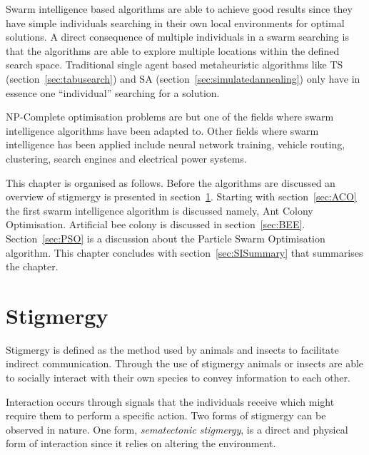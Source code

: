 Swarm intelligence based algorithms are able to achieve good results since they have simple individuals searching in their own local environments for optimal solutions\cite{CompuIntelligenceIntro,FundamentalSwarm}. A direct consequence of multiple individuals in a swarm searching is that the algorithms are able to explore multiple locations within the defined search space\cite{CompuIntelligenceIntro,FundamentalSwarm}. Traditional single agent based metaheuristic algorithms like \gls{TS} (section~\ref{sec:tabusearch}) and \gls{SA} (section~\ref{sec:simulatedannealing}) only have in essence one ``individual'' searching for a solution\cite{CompuIntelligenceIntro,FundamentalSwarm}. 

NP-Complete optimisation problems are but one of the fields where swarm intelligence algorithms have been adapted to. Other fields where swarm intelligence has been applied include neural network training\cite{CompuIntelligenceIntro}, vehicle routing\cite{ACOSurvey}, clustering\cite{AntSwarmClustering}, search engines and electrical power systems\cite{SAElectricPower}.

This chapter is organised as follows. Before the algorithms are discussed an overview of stigmergy is presented in section~\ref{sec:stigmergy}. Starting with section~\ref{sec:ACO} the first swarm intelligence algorithm is discussed namely, Ant Colony Optimisation. Artificial bee colony is discussed in section~\ref{sec:BEE}. Section~\ref{sec:PSO} is a discussion about the Particle Swarm Optimisation algorithm. This chapter concludes with section~\ref{sec:SISummary} that summarises the chapter.

\section{Stigmergy}
\label{sec:stigmergy}
Stigmergy is defined as the method used by animals and insects to facilitate indirect communication\cite{CompuIntelligenceIntro,AntIntroTrends}. Through the use of stigmergy animals or insects are able to socially interact with their own species to convey information to each other\cite{AntsAndStigmergy,FundamentalSwarm}.

Interaction occurs through signals that the individuals receive which might require them to perform a specific action\cite{AntsAndStigmergy,CompuIntelligenceIntro,AntIntroTrends}.
Two forms of stigmergy can be observed in nature. One form, \emph{sematectonic stigmergy}\label{def:sematectonic}, is a direct and physical form of interaction since it relies on altering the environment\cite{CompuIntelligenceIntro}. 

